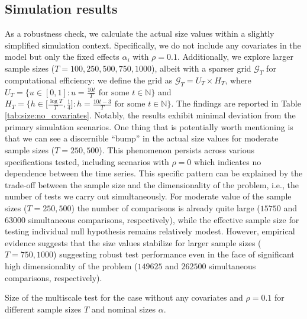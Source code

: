 \documentclass[a4paper,12pt]{article}
\begin{document}
\vspace{10pt}

{\small
\setlength{\bibsep}{0.55em}
}



\pagebreak
\subsection*{Simulation results}

As a robustness check, we calculate the actual size values within a slightly simplified simulation context. Specifically, we do not include any covariates in the model but only the fixed effects $\alpha_i$ with $\rho = 0.1$. Additionally, we explore larger sample sizes ($T=100, 250, 500, 750, 1000$), albeit with a sparser grid $\mathcal{G}_T$ for computational efficiency: we define the grid as $\mathcal{G}_T = U_T \times H_T$, where $U_T = \big\{ u \in [0,1]: u = \textstyle{\frac{10t}{T}} \text{ for some } t \in \mathbb{N} \big\}$ and $H_T = \big\{ h \in \big[ \textstyle{\frac{\log T}{T}}, \textstyle{\frac{1}{4}} \big]:  h = \textstyle{\frac{10t - 3}{T}} \text{ for some } t \in \mathbb{N} \big\}$. The findings are reported in Table \ref{tab:size:no_covariates}. Notably, the results exhibit minimal deviation from the primary simulation scenarios. One thing that is potentially worth mentioning is that we can see a discernible ``bump'' in the actual size values for moderate sample sizes ($T = 250, 500$). This phenomenon persists across various specifications tested, including scenarios with $\rho = 0$ which indicates no dependence between the time series. This specific pattern can be explained by the trade-off between the sample size and the dimensionality of the problem, i.e., the number of tests we carry out simultaneously. For moderate value of the sample sizes ($T =250, 500$) the number of comparisons is already quite large ($15750$ and $63000$ simultaneous comparisons, respectively), while the effective sample size for testing individual null hypothesis remains relatively modest. However, empirical evidence suggests that the size values stabilize for larger sample sizes ($T = 750, 1000$) suggesting robust test performance even in the face of significant high dimensionality of the problem ($149625 $ and $262500$ simultaneous comparisons, respectively).
\addtocounter{table}{-1} 
\begin{table}[t]
\footnotesize{
\begin{center}
\caption{Size of the multiscale test for the case without any covariates and $\rho = 0.1$ for different sample sizes $T$ and nominal sizes $\alpha$.}
\label{tab:size:no_covariates}
\renewcommand{\arraystretch}{1.2}

\end{center}}
\vspace{-0.4cm}
\end{table}
\end{document}
